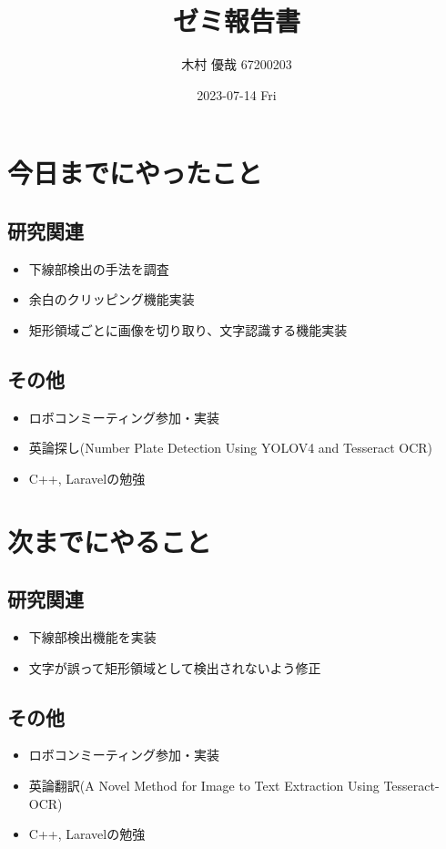 \documentclass[uplatex, onecolumn, 10pt]{jsarticle}
\begin{document}
\title{\vspace{-40mm}\bf{\LARGE{ゼミ報告書}}}
\author{\vspace{-40mm}木村 優哉 67200203}
\date{2023-07-14 Fri}
\maketitle


\section{今日までにやったこと}

\subsection*{研究関連}
\begin{itemize}
	\item 下線部検出の手法を調査
	\item 余白のクリッピング機能実装
	\item 矩形領域ごとに画像を切り取り、文字認識する機能実装
\end{itemize}

\subsection*{その他}
\begin{itemize}
	\item ロボコンミーティング参加・実装
	\item 英論探し(Number Plate Detection Using YOLOV4 and Tesseract OCR)
	\item C++, Laravelの勉強
\end{itemize}


\section{次までにやること}

\subsection*{研究関連}
\begin{itemize}
	\item 下線部検出機能を実装
	\item 文字が誤って矩形領域として検出されないよう修正
\end{itemize}

\subsection*{その他}
\begin{itemize}
	\item ロボコンミーティング参加・実装
	\item 英論翻訳(A Novel Method for Image to Text Extraction Using Tesseract-OCR)
	\item C++, Laravelの勉強
\end{itemize}
\end{document}
